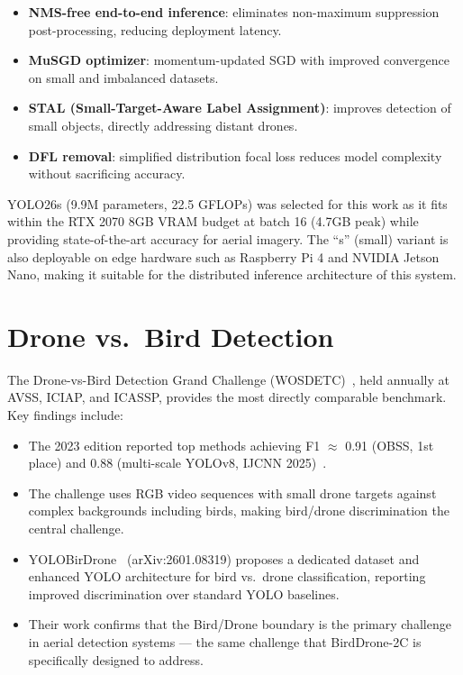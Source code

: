 \documentclass[12pt,a4paper]{report}
\begin{document}
\begin{itemize}
  \item \textbf{NMS-free end-to-end inference}: eliminates non-maximum
        suppression post-processing, reducing deployment latency.
  \item \textbf{MuSGD optimizer}: momentum-updated SGD with improved
        convergence on small and imbalanced datasets.
  \item \textbf{STAL (Small-Target-Aware Label Assignment)}: improves
        detection of small objects, directly addressing distant drones.
  \item \textbf{DFL removal}: simplified distribution focal loss reduces
        model complexity without sacrificing accuracy.
\end{itemize}

YOLO26s (9.9M parameters, 22.5 GFLOPs) was selected for this work as it
fits within the RTX 2070 8GB VRAM budget at batch 16 (4.7GB peak) while
providing state-of-the-art accuracy for aerial imagery. The ``s'' (small)
variant is also deployable on edge hardware such as Raspberry Pi 4 and
NVIDIA Jetson Nano, making it suitable for the distributed inference
architecture of this system.

\section{Drone vs.\ Bird Detection}

The Drone-vs-Bird Detection Grand Challenge (WOSDETC)~\cite{coluccia2023},
held annually at AVSS, ICIAP, and ICASSP, provides the most directly
comparable benchmark. Key findings include:

\begin{itemize}
  \item The 2023 edition reported top methods achieving F1 $\approx$ 0.91 (OBSS, 1st place)
        and 0.88 (multi-scale YOLOv8, IJCNN 2025)~\cite{simd3_2025}.
  \item The challenge uses RGB video sequences with small drone targets against complex
        backgrounds including birds, making bird/drone discrimination the central challenge.
  \item YOLOBirDrone~\cite{yolobirdrone2025} (arXiv:2601.08319) proposes a dedicated dataset
        and enhanced YOLO architecture for bird vs.\ drone classification, reporting improved
        discrimination over standard YOLO baselines.
  \item Their work confirms that the Bird/Drone boundary is the primary challenge in aerial
        detection systems --- the same challenge that BirdDrone-2C is specifically designed
        to address.
\end{itemize}
\end{document}
